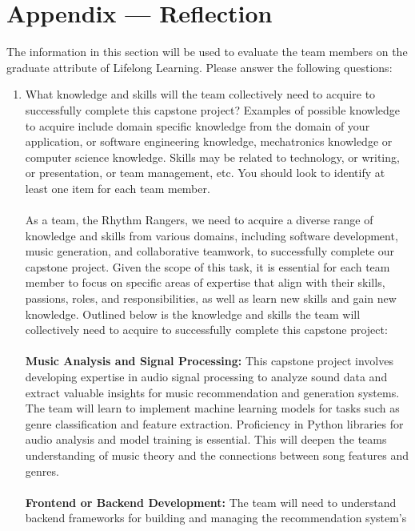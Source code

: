 \documentclass[12pt]{article}
\begin{document}
\newpage{}
\section*{Appendix --- Reflection}

The information in this section will be used to evaluate the team members on the
graduate attribute of Lifelong Learning.  Please answer the following questions:

\begin{enumerate}
  \item What knowledge and skills will the team collectively need to acquire to
  successfully complete this capstone project?  Examples of possible knowledge
  to acquire include domain specific knowledge from the domain of your
  application, or software engineering knowledge, mechatronics knowledge or
  computer science knowledge.  Skills may be related to technology, or writing,
  or presentation, or team management, etc.  You should look to identify at
  least one item for each team member.
  \\ \\ 
  As a team, the Rhythm Rangers, we need to acquire a diverse range of knowledge and skills from various domains, including software development, 
  music generation, and collaborative teamwork, to successfully complete our capstone project. Given the scope of this task, it is essential 
  for each team member to focus on specific areas of expertise that align with their skills, passions, roles, and responsibilities, 
  as well as learn new skills and gain new knowledge. Outlined below is the knowledge and skills the team will collectively need to acquire
  to successfully complete this capstone project: 
  \\ \\
  \textbf{Music Analysis and Signal Processing:} This capstone project involves developing expertise in audio signal processing to analyze sound data and extract 
  valuable insights for music recommendation and generation systems. The team will learn to implement machine learning models for tasks such as genre 
  classification and feature extraction. Proficiency in Python libraries for audio analysis and model training is essential. This will deepen the 
  teams understanding of music theory and the connections between song features and genres.
  \\ \\ 
  \textbf{Frontend or Backend Development:} The team will need to understand backend frameworks for building and managing the recommendation system's 

\end{enumerate}
\end{document}
